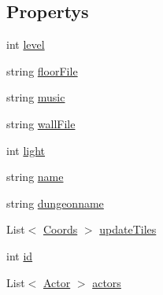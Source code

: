 \subsection*{Propertys}
\begin{DoxyCompactItemize}
\item 
int \hyperlink{class_gruppe22_1_1_backend_1_1_map_abf7263c43d22ca634eceba89c06904cf}{level}
\item 
string \hyperlink{class_gruppe22_1_1_backend_1_1_map_ae0e576fd7e8d25a3eb0370f2bcc896e1}{floor\-File}
\item 
string \hyperlink{class_gruppe22_1_1_backend_1_1_map_af94c194982941748ccc41e58a2398691}{music}
\item 
string \hyperlink{class_gruppe22_1_1_backend_1_1_map_ac30d110dd5617ce4ee1f0cab607ea6e8}{wall\-File}
\item 
int \hyperlink{class_gruppe22_1_1_backend_1_1_map_a520dd5d828f2d1d0459736fe6bd09831}{light}
\item 
string \hyperlink{class_gruppe22_1_1_backend_1_1_map_a7829a94426d54e43019423f88a7cec59}{name}
\item 
string \hyperlink{class_gruppe22_1_1_backend_1_1_map_a76814bb49c2210b400230b9ee530010f}{dungeonname}
\item 
List$<$ \hyperlink{class_gruppe22_1_1_backend_1_1_coords}{Coords} $>$ \hyperlink{class_gruppe22_1_1_backend_1_1_map_a33e42ed0b62ddb58ce402fb6fc455fdb}{update\-Tiles}
\item 
int \hyperlink{class_gruppe22_1_1_backend_1_1_map_a31168190229d5fdaad90a0e27d41ef1a}{id}
\item 
List$<$ \hyperlink{class_gruppe22_1_1_backend_1_1_actor}{Actor} $>$ \hyperlink{class_gruppe22_1_1_backend_1_1_map_a5b7ce0cacb479c6590d249aae60138fd}{actors}

\end{DoxyCompactItemize}
